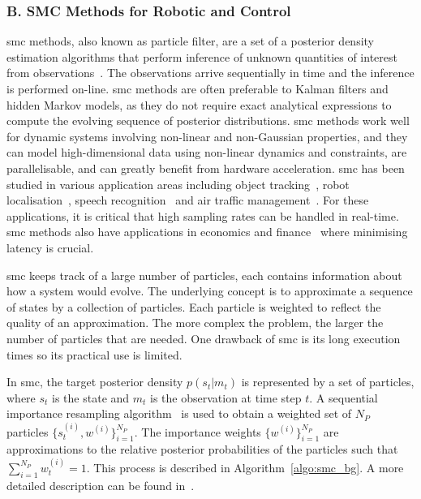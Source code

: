 \subsubsection{B. SMC Methods for Robotic and Control}
\label{sec:smc}

\gls{smc} methods, also known as particle filter, are a set of a posterior density estimation algorithms that perform inference of unknown quantities of interest from observations~\cite{doucet01}.
The observations arrive sequentially in time and the inference is performed on-line.
\gls{smc} methods are often preferable to Kalman filters and hidden Markov models, as they do not require exact analytical expressions to compute the evolving sequence of posterior distributions.
\gls{smc} methods work well for dynamic systems involving non-linear and non-Gaussian properties, and they can model high-dimensional data using non-linear dynamics and constraints, are parallelisable, and can greatly benefit from hardware acceleration.
\gls{smc} has been studied in various application areas including object tracking~\cite{happe11}, robot localisation~\cite{montemerlo02}, speech recognition~\cite{vermaak02} and air traffic management~\cite{kantas09,eele11}.
For these applications, it is critical that high sampling rates can be handled in real-time.
\gls{smc} methods also have applications in economics and finance~\cite{creal12} where minimising latency is crucial.

\gls{smc} keeps track of a large number of particles, each contains information about how a system would evolve.
The underlying concept is to approximate a sequence of states by a collection of particles.
Each particle is weighted to reflect the quality of an approximation.
The more complex the problem, the larger the number of particles that are needed.
One drawback of \gls{smc} is its long execution times so its practical use is limited.

In \gls{smc}, the target posterior density $p(s_t|m_t)$ is represented by a set of particles, where $s_t$ is the state and $m_t$ is the observation at time step $t$.
A sequential importance resampling algorithm~\cite{gordon93} is used to obtain a weighted set of $N_P$ particles $\{s_t^{(i)},w^{(i)}\}^{N_P}_{i=1}$.
The importance weights $\{w^{(i)}\}^{N_P}_{i=1}$ are approximations to the relative posterior probabilities of the particles such that $\sum^{N_P}_{i=1}w^{(i)}_t = 1$.
This process is described in Algorithm~\ref{algo:smc_bg}.
A more detailed description can be found in~\cite{doucet01}. 

